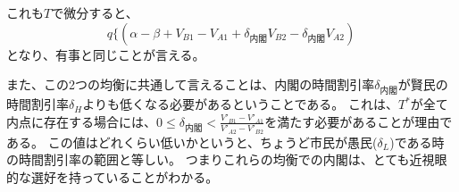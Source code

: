 \documentclass[main.tex]{subfiles}
\begin{document}
これも$T$で微分すると、
$$q\lbrace (\alpha - \beta + V_{B1}-V_{A1} + \delta_{内閣}V_{B2} -\delta_{内閣}V_{A2}   )$$
となり、有事と同じことが言える。

また、この2つの均衡に共通して言えることは、内閣の時間割引率$\delta_{内閣}$が賢民の時間割引率$\delta_H$よりも低くなる必要があるということである。
これは、$T^*$が全て内点に存在する場合には、$0\le \delta_{内閣} < \frac{V'_{B1} - V'_{A1}}{V'_{A2} - V'_{B2}}$を満たす必要があることが理由である。
この値はどれくらい低いかというと、ちょうど市民が愚民($\delta_L$)である時の時間割引率の範囲と等しい。
つまりこれらの均衡での内閣は、とても近視眼的な選好を持っていることがわかる。

































\end{document}
